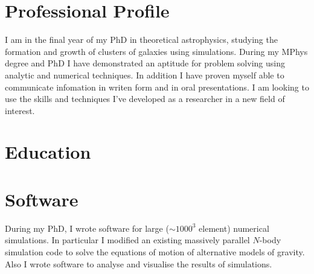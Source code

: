 \documentclass[11pt,a4paper,roman]{moderncv}        %
\begin{document}
\makecvtitle

\section{Professional Profile}
I am in the final year of my PhD in theoretical astrophysics, studying the formation and growth of clusters of galaxies using simulations. 
During my MPhys degree and PhD I have demonstrated an aptitude for problem solving using analytic and numerical techniques. 
In addition I have proven myself able to communicate infomation in writen form and in oral presentations.
I am looking to use the skills and techniques I've developed as a researcher in a new field of interest.

\section{Education}
\section{Software}
During my PhD, I wrote software for large ($\sim1000^3$ element) numerical simulations.
In particular I modified an existing massively parallel $N$-body simulation code to solve the equations of motion of alternative models of gravity.
Also I wrote software to analyse and visualise the results of simulations.
\newline
\newline
{}
\end{document}
